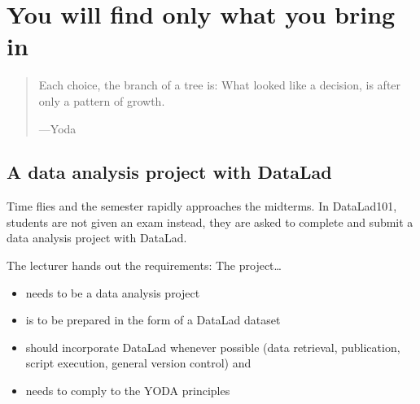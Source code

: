 \chapter{You will find only what you bring in}
\label{\detokenize{basics/basics-yoda:you-will-find-only-what-you-bring-in}}\label{\detokenize{basics/basics-yoda:chapter-yoda}}\label{\detokenize{basics/basics-yoda::doc}}
\begin{quote}

\sphinxAtStartPar
Each choice, the branch of a tree is: What looked like a decision, is after only a pattern of growth.

\begin{flushright}
---Yoda
\end{flushright}
\end{quote}

\sphinxstepscope


\section{A data analysis project with DataLad}
\label{\detokenize{basics/101-126-intro:a-data-analysis-project-with-datalad}}\label{\detokenize{basics/101-126-intro:intromidterm}}\label{\detokenize{basics/101-126-intro::doc}}
\sphinxAtStartPar
Time flies and the semester rapidly approaches the midterms.
In DataLad\sphinxhyphen{}101, students are not given an exam \textendash{} instead, they are
asked to complete and submit a data analysis project with DataLad.

\sphinxAtStartPar
The lecturer hands out the requirements: The project…
\begin{itemize}
\item {} 
\sphinxAtStartPar
needs to be a data analysis project

\item {} 
\sphinxAtStartPar
is to be prepared in the form of a DataLad dataset

\item {} 
\sphinxAtStartPar
should incorporate DataLad whenever possible (data retrieval, publication,
script execution, general version control) and

\item {} 
\sphinxAtStartPar
needs to comply to the YODA principles

\end{itemize}

